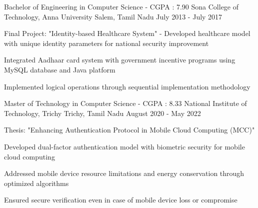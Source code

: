 \documentclass[11pt, a4paper]{awesome-cv} %
\begin{document}
\makecvheader %

\begin{cventries}
\cventry
    {Bachelor of Engineering in Computer Science  -  CGPA : 7.90} %
    {Sona College of Technology, Anna University} %
    {Salem, Tamil Nadu} %
    {July 2013 - July 2017} %
    {
      \begin{cvitems}
        \item {Final Project: "Identity-based Healthcare System" - Developed healthcare model with unique identity parameters for national security improvement}
        \item {Integrated Aadhaar card system with government incentive programs using MySQL database and Java platform}
        \item {Implemented logical operations through sequential implementation methodology}
      \end{cvitems}
    }

    \cventry
    {Master of Technology in Computer Science  - CGPA : 8.33} %
    {National Institute of Technology, Trichy} %
    {Trichy, Tamil Nadu} %
    {August 2020 - May 2022} %
    {
      \begin{cvitems}
        \item {Thesis: "Enhancing Authentication Protocol in Mobile Cloud Computing (MCC)"}
        \item {Developed dual-factor authentication model with biometric security for mobile cloud computing}
        \item {Addressed mobile device resource limitations and energy conservation through optimized algorithms}
        \item {Ensured secure verification even in case of mobile device loss or compromise}
      \end{cvitems}
    }
\end{cventries}

\begin{cvskills}
\end{cvskills}
\end{document}
